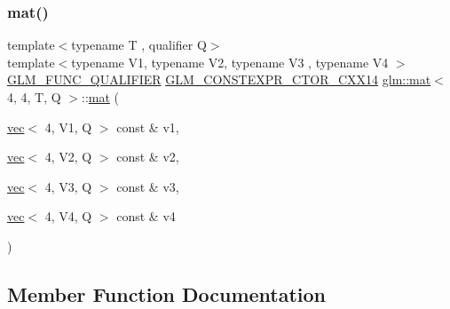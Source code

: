 \mbox{\label{structglm_1_1mat_3_014_00_014_00_01_t_00_01_q_01_4_a64d62a7aac7c48e676c72563f1e4c100}} 
\subsubsection{\texorpdfstring{mat()}{mat()}\hspace{0.1cm}{\footnotesize\ttfamily [21/21]}}
{\footnotesize\ttfamily template$<$typename T , qualifier Q$>$ \\
template$<$typename V1, typename V2, typename V3 , typename V4 $>$ \\
\hyperlink{setup_8hpp_a33fdea6f91c5f834105f7415e2a64407}{G\+L\+M\+\_\+\+F\+U\+N\+C\+\_\+\+Q\+U\+A\+L\+I\+F\+I\+ER} \hyperlink{setup_8hpp_a0900f9145e68bf6061b6f5e7be3fa751}{G\+L\+M\+\_\+\+C\+O\+N\+S\+T\+E\+X\+P\+R\+\_\+\+C\+T\+O\+R\+\_\+\+C\+X\+X14} \hyperlink{structglm_1_1mat}{glm\+::mat}$<$ 4, 4, T, Q $>$\+::\hyperlink{structglm_1_1mat}{mat} (\begin{DoxyParamCaption}\item[{\hyperlink{structglm_1_1vec}{vec}$<$ 4, V1, Q $>$ const \&}]{v1,  }\item[{\hyperlink{structglm_1_1vec}{vec}$<$ 4, V2, Q $>$ const \&}]{v2,  }\item[{\hyperlink{structglm_1_1vec}{vec}$<$ 4, V3, Q $>$ const \&}]{v3,  }\item[{\hyperlink{structglm_1_1vec}{vec}$<$ 4, V4, Q $>$ const \&}]{v4 }\end{DoxyParamCaption})}



\subsection{Member Function Documentation}
\mbox{\label{structglm_1_1mat_3_014_00_014_00_01_t_00_01_q_01_4_a345a0bcf281399c047cb15a6551232b0}} 
